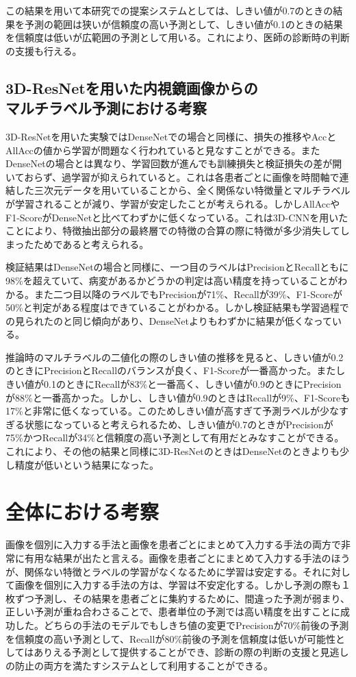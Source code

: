 この結果を用いて本研究での提案システムとしては、しきい値が0.7のときの結果を予測の範囲は狭いが信頼度の高い予測として、しきい値が0.1のときの結果を信頼度は低いが広範囲の予測として用いる。これにより、医師の診断時の判断の支援も行える。

\subsection{3D-ResNetを用いた内視鏡画像からの\\マルチラベル予測における考察}
3D-ResNetを用いた実験ではDenseNetでの場合と同様に、損失の推移やAccとAllAccの値から学習が問題なく行われていると見なすことができる。またDenseNetの場合とは異なり、学習回数が進んでも訓練損失と検証損失の差が開いておらず、過学習が抑えられていると。これは各患者ごとに画像を時間軸で連結した三次元データを用いていることから、全く関係ない特徴量とマルチラベルが学習されることが減り、学習が安定したことが考えられる。しかしAllAccやF1-ScoreがDenseNetと比べてわずかに低くなっている。これは3D-CNNを用いたことにより、特徴抽出部分の最終層での特徴の合算の際に特徴が多少消失してしまったためであると考えられる。

検証結果はDenseNetの場合と同様に、一つ目のラベルはPrecisionとRecallともに98\%を超えていて、病変があるかどうかの判定は高い精度を持っていることがわかる。また二つ目以降のラベルでもPrecisionが71\%、Recallが39\%、F1-Scoreが50\%と判定がある程度はできていることがわかる。しかし検証結果も学習過程での見られたのと同じ傾向があり、DenseNetよりもわずかに結果が低くなっている。

推論時のマルチラベルの二値化の際のしきい値の推移を見ると、しきい値が0.2のときにPrecisionとRecallのバランスが良く、F1-Scoreが一番高かった。またしきい値が0.1のときにRecallが83\%と一番高く、しきい値が0.9のときにPrecisionが88\%と一番高かった。しかし、しきい値が0.9のときはRecallが9\%、F1-Scoreも17\%と非常に低くなっている。このためしきい値が高すぎて予測ラベルが少なすぎる状態になっていると考えられるため、しきい値が0.7のときがPrecisionが75\%かつRecallが34\%と信頼度の高い予測として有用だとみなすことができる。これにより、その他の結果と同様に3D-ResNetのときはDenseNetのときよりも少し精度が低いという結果になった。

\section{全体における考察}
画像を個別に入力する手法と画像を患者ごとにまとめて入力する手法の両方で非常に有用な結果が出たと言える。画像を患者ごとにまとめて入力する手法のほうが、関係ない特徴とラベルの学習がなくなるために学習は安定する。それに対して画像を個別に入力する手法の方は、学習は不安定化する。しかし予測の際も１枚ずつ予測し、その結果を患者ごとに集約するために、間違った予測が弱まり、正しい予測が重ね合わさることで、患者単位の予測では高い精度を出すことに成功した。どちらの手法のモデルでもしきち値の変更でPrecisionが70\%前後の予測を信頼度の高い予測として、Recallが80\%前後の予測を信頼度は低いが可能性としてはありえる予測として提供することができ、診断の際の判断の支援と見逃しの防止の両方を満たすシステムとして利用することができる。
